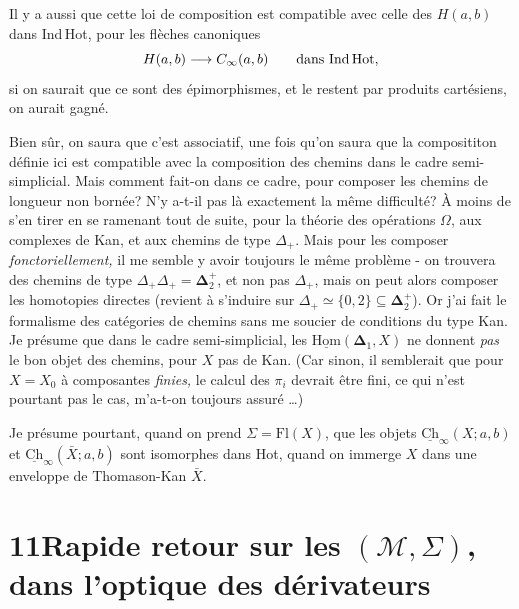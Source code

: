 \documentclass[11pt]{article}
\newcommand{\printedpage}[1]{\marginpar{\footnotesize p.~#1}}
\newcommand{\msp}[1]{\marginpar{\footnotesize [#1]}}
\newcommand{\Ch}{\underline{\mathrm{Ch}}}
\newcommand{\uHom}{\underline{\mathrm{Hom}}}
\begin{document}
\clearpage
\printedpage{80}

Il y a aussi que cette loi de composition est compatible avec celle des $H(a,b)$ dans Ind\,Hot, pour les flèches canoniques
\[ H(a,b)\longrightarrow C_\infty(a,b) \qquad \text{dans Ind\,Hot}, \]
si on saurait que ce sont des épimorphismes, et le restent par produits cartésiens, on aurait gagné.

Bien sûr, on saura que c'est associatif, une fois qu'on saura que la composititon définie ici est compatible avec la composition des chemins dans le cadre semi-simplicial. Mais comment fait-on dans ce cadre, pour composer les chemins de longueur non bornée? N'y a-t-il pas là exactement la même difficulté? À moins de s'en %
\msp{page 128}
tirer en se ramenant tout de suite, pour la théorie des opérations $\Omega$, aux complexes de Kan, et aux chemins de type $\Delta_+$. Mais pour les composer \textit{fonctoriellement,} il me semble y avoir toujours le même problème - on trouvera des chemins de type $\Delta_+\Delta_+ = \boldsymbol{\Delta}_2^+$, et non pas $\Delta_+$, mais on peut alors composer les homotopies directes (revient à s'induire sur $\Delta_+\simeq\{0,2\}\subseteq\boldsymbol{\Delta}_2^+$). Or j'ai fait le formalisme des catégories de chemins sans me soucier de conditions du type Kan. Je présume que dans le cadre semi-simplicial, les $\uHom(\boldsymbol{\Delta}_1,X)$ ne donnent \textit{pas} le bon objet des chemins, pour $X$ pas de Kan. (Car sinon, il semblerait que pour $X=X_0$ à composantes \textit{finies,} le calcul des $\pi_i$ devrait être fini, ce qui n'est pourtant pas le cas, m'a-t-on toujours assuré \dots)

Je présume pourtant, quand on prend $\Sigma=\mathrm{Fl}(X)$, que les objets $\Ch_\infty(X;a,b)$ et $\Ch_\infty(\bar{X};a,b)$ sont isomorphes dans Hot, quand on immerge $X$ dans une enveloppe de Thomason-Kan $\bar{X}$.

\clearpage
\printedpage{81}

\msp{page 129}

\section*{11\quad Rapide retour sur les $(\mathcal{M},\Sigma)$, dans l'optique des dérivateurs}
\end{document}
